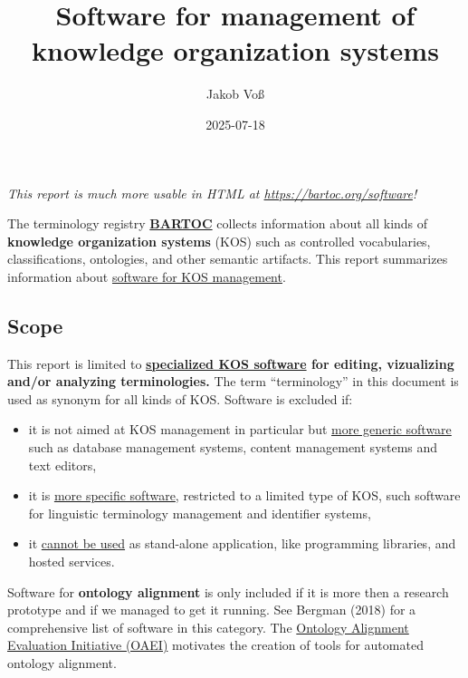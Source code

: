 \documentclass[
  DIV=10]{article}
\title{Software for management of knowledge organization systems}
\author{Jakob Voß}
\affil{%
                  Verbundzentrale des GBV (VZG)
              }
\date{2025-07-18}
\providecommand{\tightlist}{%
  \setlength{\itemsep}{0pt}\setlength{\parskip}{0pt}}
\begin{document}
\maketitle


\large

\emph{This report is much more usable in HTML at
\url{https://bartoc.org/software}!} \vspace*{20mm}

The terminology registry \textbf{\href{https://bartoc.org/}{BARTOC}}
collects information about all kinds of \textbf{knowledge organization
systems} (KOS) such as controlled vocabularies, classifications,
ontologies, and other semantic artifacts. This report summarizes
information about \hyperref[kos-software]{software for KOS management}.

\subsection{Scope}\label{scope}

This report is limited to \textbf{\hyperref[kos-software]{specialized
KOS software} for editing, vizualizing and/or analyzing terminologies.}
The term ``terminology'' in this document is used as synonym for all
kinds of KOS. Software is excluded if:

\begin{itemize}
\tightlist
\item
  it is not aimed at KOS management in particular but
  \hyperref[more-generic-software]{more generic software} such as
  database management systems, content management systems and text
  editors,
\item
  it is \hyperref[more-specific-software]{more specific software},
  restricted to a limited type of KOS, such software for linguistic
  terminology management and identifier systems,
\item
  it \hyperref[limited-use]{cannot be used} as stand-alone application,
  like programming libraries, and hosted services.
\end{itemize}

Software for \textbf{ontology alignment} is only included if it is more
then a research prototype and if we managed to get it running. See
Bergman (2018) for a comprehensive list of software in this category.
The \href{https://oaei.ontologymatching.org/}{Ontology Alignment
Evaluation Initiative (OAEI)} motivates the creation of tools for
automated ontology alignment.

\newpage
{}
\recalctypearea
\end{document}
